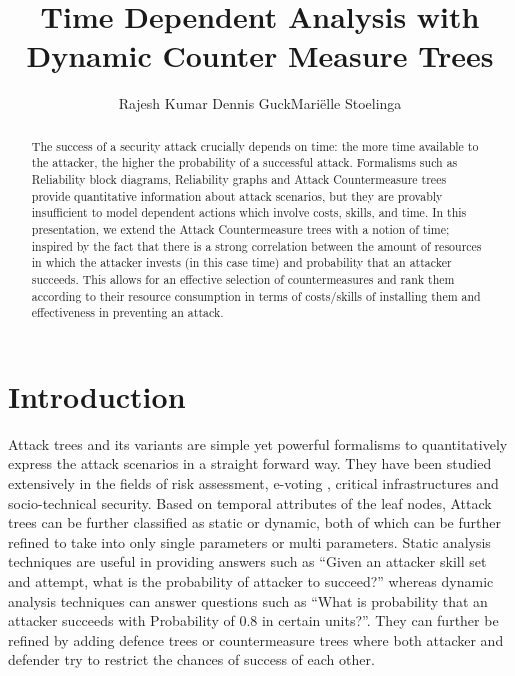\documentclass[submission,copyright,creativecommons]{eptcs}
\title{Time Dependent Analysis with \\Dynamic Counter Measure Trees}
\author{Rajesh Kumar \qquad Dennis Guck\qquad Mari{\"e}lle Stoelinga
\institute{Formal Methods and Tools\\
University of Twente\\
Enschede, Netherlands}
\email{\{r.kumar,d.guck,m.i.a.stoelinga\}@utwente.nl}
}
\begin{document}
\maketitle

\begin{abstract}
The success of a security attack crucially depends on time: the more time available to the attacker, the higher the probability of a successful attack. Formalisms such as Reliability block diagrams, Reliability graphs and Attack Countermeasure trees provide quantitative information about attack scenarios, but they are provably insufficient to model dependent actions which involve costs, skills, and time. In this presentation, we extend the Attack Countermeasure trees with a notion of time; inspired by the fact that there is a strong correlation between the amount of resources in which the attacker invests (in this case time) and probability that an attacker succeeds. This allows for an effective selection of countermeasures and rank them according to their resource consumption in terms of costs/skills of installing them and effectiveness in preventing an attack.
\end{abstract}

\section{Introduction}

Attack trees \cite{Schneier} and its variants\cite{ATformal} are simple yet powerful formalisms to quantitatively express the attack scenarios in a straight forward way. They have been studied extensively in the fields of risk assessment\cite{Paul}, e-voting \cite{2006}, critical infrastructures\cite{Byres13} and socio-technical security\cite{Reddy}. Based on temporal attributes of the leaf nodes, Attack trees can be further classified as static or dynamic, both of which can be further refined to take into only single parameters\cite{ADT}\cite{singleparam} or multi parameters\cite{multiparam}. Static analysis techniques are useful in providing answers such as ``Given an attacker skill set and attempt, what is the probability of attacker to succeed?'' whereas dynamic analysis techniques can answer questions such as ``What is probability that an attacker succeeds with Probability of 0.8 in certain  units?''. They can further be refined by adding defence trees\cite{DT} or countermeasure trees\cite{ACT} where both attacker and defender try to restrict the chances of success of each other.
\end{document}
